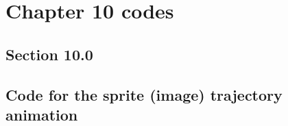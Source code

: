\documentclass{tufte-book} %
\begin{document}
%
\newpage


\section{Chapter 10 codes}


\subsection*{\textbf{Section 10.0}}

\subsection*{Code for the sprite (image) trajectory animation}
\end{document}
